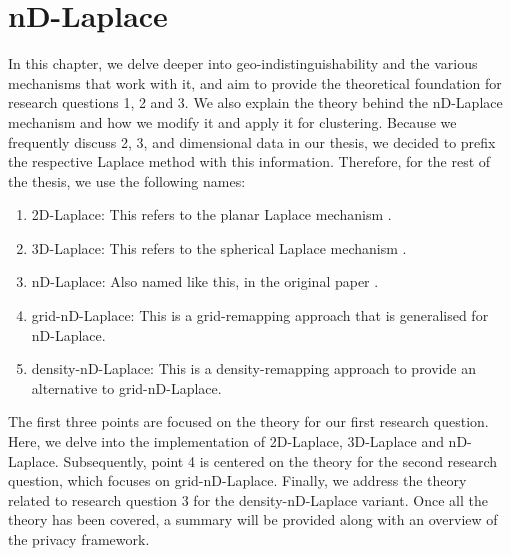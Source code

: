 \chapter{nD-Laplace}
In this chapter, we delve deeper into geo-indistinguishability and the various mechanisms that work with it, and aim to provide the theoretical foundation for research questions 1, 2 and 3.
We also explain the theory behind the nD-Laplace mechanism and how we modify it and apply it for clustering.
Because we frequently discuss 2, 3, and dimensional data in our thesis, we decided to prefix the respective Laplace method with this information.
Therefore, for the rest of the thesis, we use the following names:
\begin{enumerate}
  \item 2D-Laplace: This refers to the planar Laplace mechanism \citep{DBLP:journals/corr/abs-1212-1984}.
  \item 3D-Laplace: This refers to the spherical Laplace mechanism \citep{9646489}.
  \item nD-Laplace: Also named like this, in the original paper \citep{fernandes_generalised_2019}.
  \item grid-nD-Laplace: This is a grid-remapping approach that is generalised for nD-Laplace.
  \item density-nD-Laplace: This is a density-remapping approach to provide an alternative to grid-nD-Laplace.
\end{enumerate}
The first three points are focused on the theory for our first research question. Here, we delve into the implementation of 2D-Laplace, 3D-Laplace and nD-Laplace. Subsequently, point 4 is centered on the theory for the second research question, which focuses on grid-nD-Laplace. Finally, we address the theory related to research question 3 for the density-nD-Laplace variant. Once all the theory has been covered, a summary will be provided along with an overview of the privacy framework.



\newpage
